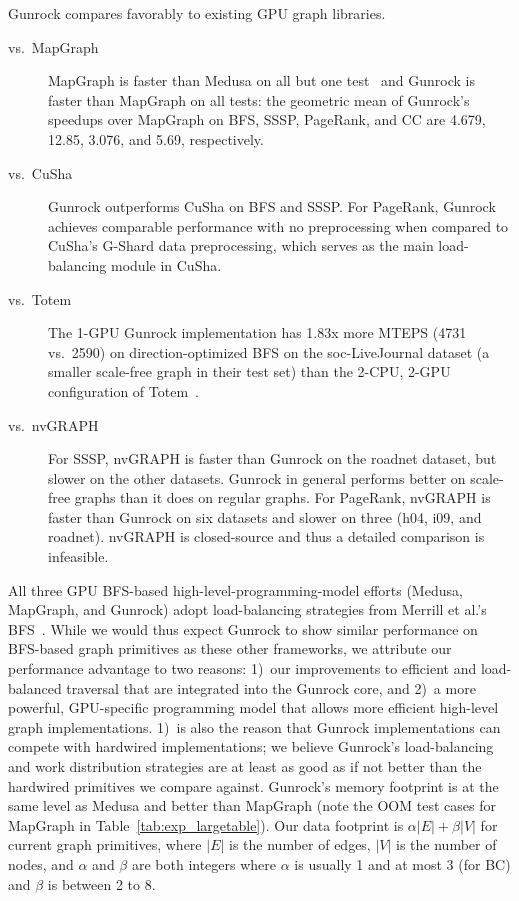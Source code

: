 \documentclass[format=acmsmall,review=false,screen=true]{acmart}
\begin{document}
Gunrock compares favorably to existing GPU graph libraries.
\begin{description}
\item[vs.\ MapGraph] MapGraph is faster than Medusa on all but one
  test~\cite{Fu:2014:MAH} and Gunrock is faster than MapGraph on all
  tests: the geometric mean of Gunrock's speedups over MapGraph on
  BFS, SSSP, PageRank, and CC are 4.679, 12.85, 3.076, and 5.69,
  respectively.
\item[vs.\ CuSha] Gunrock outperforms CuSha on BFS and SSSP\@. For
  PageRank, Gunrock achieves comparable performance with no
  preprocessing when compared to CuSha's G-Shard data preprocessing,
  which serves as the main load-balancing module in CuSha.
\item[vs.\ Totem] The 1-GPU Gunrock implementation has 1.83x more
  MTEPS (4731 vs.\ 2590) on direction-optimized BFS on the
  soc-LiveJournal dataset (a smaller scale-free graph in their test
  set) than the 2-CPU, 2-GPU configuration of
  Totem~\cite{Sallinen:2015:ADB}.
\item[vs.\ nvGRAPH] For SSSP, nvGRAPH is faster than Gunrock on the
  roadnet dataset, but slower on the other datasets. Gunrock in
  general performs better on scale-free graphs than it does on regular
  graphs. For PageRank, nvGRAPH is
  faster than Gunrock on six datasets and slower on three (h04, i09,
  and roadnet). nvGRAPH is closed-source and thus a detailed
  comparison is infeasible.
\end{description}
All three GPU BFS-based high-level-programming-model efforts (Medusa,
MapGraph, and Gunrock) adopt load-balancing strategies from Merrill et
al.'s BFS~\cite{Merrill:2012:SGG}. While we would thus expect Gunrock
to show similar performance on BFS-based graph primitives as these
other frameworks, we attribute our performance advantage to two
reasons: 1)~our improvements to efficient and load-balanced traversal
that are integrated into the Gunrock core, and 2)~a more powerful,
GPU-specific programming model that allows more efficient high-level
graph implementations. 1)~is also the reason that Gunrock
implementations can compete with hardwired implementations; we believe
Gunrock's load-balancing and work distribution strategies are at least
as good as if not better than the hardwired primitives we compare
against. Gunrock's memory footprint is at the same level as Medusa and
better than MapGraph (note the OOM test cases for MapGraph in
Table~\ref{tab:exp_largetable}). Our data footprint is
$\alpha|E|+\beta|V|$ for current graph primitives, where $|E|$ is the
number of edges, $|V|$ is the number of nodes, and $\alpha$ and
$\beta$ are both integers where $\alpha$ is usually 1 and at most 3
(for BC) and $\beta$ is between 2 to 8.
\end{document}
